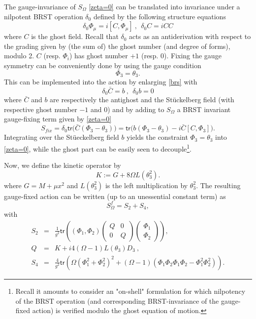 \documentclass[11pt]{book}
\newcommand{\tr}{\mathsf{tr}}
\theoremstyle{break}
\begin{document}
%
The gauge-invariance of $S_\Omega$ \eqref{zeta=0} can be translated into invariance under a nilpotent BRST operation $\delta_0$ defined by the following structure equations \cite{MVW13}%
%
\begin{equation}
\delta_0 \Phi_\mu = i [C,\Phi_\mu] \ , \ \ \delta_0C=iCC\label{brs}
\end{equation}
%
where $C$ is the ghost field. Recall that $\delta_0$ acts as an antiderivation with respect to the grading given by (the sum of) the ghost number (and degree of forms), modulo 2. $C$ (resp. $\Phi_i$) has ghost number $+1$ (resp. $0$). Fixing the gauge symmetry can be conveniently done by using the gauge condition 
\begin{equation}
\Phi_3=\theta_3\label{special-gauge}.
\end{equation}
This can be implemented into the action by enlarging \eqref{brs} with%
%
\begin{equation}
\delta_0 {\bar{C}} = b \ , \ \ \delta_0b = 0 \label{contractible-brs}
\end{equation}
%
where ${\bar{C}}$ and $b$ are respectively the antighost and the St\"uckelberg field (with respective ghost number $-1$ and $0$) and by adding to $S_\Omega$ a BRST invariant gauge-fixing term given by \eqref{zeta=0}%
%
\begin{equation}
S_{fix}=\delta_0\tr\big({\bar{C}}(\Phi_3-\theta_3) \big)=\tr\big(b(\Phi_3-\theta_3)-i{\bar{C}}[C,\Phi_3]\big)\label{gauge-fix}.
\end{equation}
%
Integrating over the St\"ueckelberg field $b$ yields the constraint $\Phi_3=\theta_3$ into \eqref{zeta=0}, while the ghost part can be easily seen to decouple{\footnote{Recall it amounts to consider an "on-shell" formulation for which nilpotency of the BRST operation (and corresponding BRST-invariance of the gauge-fixed action) is verified modulo the ghost equation of motion.}}. \par 
Now, we define the kinetic operator by%
%
\begin{equation}
K:=G+8\Omega L(\theta_3^2)\label{operator-K}.
\end{equation}
where $G=M+\mu x^2$ and $L(\theta^{2}_{3})$ is the left multiplication by $\theta^{2}_{3}$.
%
The resulting gauge-fixed action can be written (up to an unessential constant term) as
%
\begin{equation}
S^f_\Omega=S_2+S_4\label{stot},
\end{equation}
with%
\begin{eqnarray}
S_2 &=& \frac{1}{g^2} \tr ((\Phi_1,\Phi_2)
\begin{pmatrix}
Q&0\\
0&Q
\end{pmatrix} 
\begin{pmatrix}
\Phi_1\\
\Phi_2
\end{pmatrix} 
) , \nonumber \\
Q &=& K + i4 (\Omega-1) L(\theta_3) D_3 \ , \label{squad1} \\[5pt]
S_4 &=& \frac{4}{g^2} \tr \left( \Omega (\Phi_1^2 + \Phi_2^2)^2 + (\Omega-1)(\Phi_1\Phi_2\Phi_1\Phi_2 - \Phi_1^2\Phi_2^2) \right) . \label{squart}
\end{eqnarray}
\end{document}
